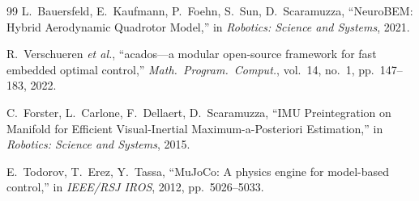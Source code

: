 \documentclass[lettersize,journal]{IEEEtran}
\begin{document}
\begin{thebibliography}{99}
L.~Bauersfeld, E.~Kaufmann, P.~Foehn, S.~Sun, D.~Scaramuzza,
``NeuroBEM: Hybrid Aerodynamic Quadrotor Model,''
in \emph{Robotics: Science and Systems}, 2021.

R.~Verschueren \emph{et al.},
``acados---a modular open-source framework for fast embedded optimal control,''
\emph{Math.\ Program.\ Comput.}, vol.~14, no.~1, pp.~147--183, 2022.

C.~Forster, L.~Carlone, F.~Dellaert, D.~Scaramuzza,
``IMU Preintegration on Manifold for Efficient Visual-Inertial Maximum-a-Posteriori Estimation,''
in \emph{Robotics: Science and Systems}, 2015.

E.~Todorov, T.~Erez, Y.~Tassa,
``MuJoCo: A physics engine for model-based control,''
in \emph{IEEE/RSJ IROS}, 2012, pp.~5026--5033.

\end{thebibliography}
\end{document}
